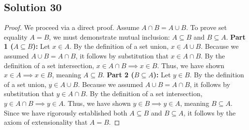 \documentclass[12pt]{article}
\begin{document}
\subsection*{Solution 30}
\begin{proof}
We proceed via a direct proof. Assume $A \cap B = A \cup B$. To prove set equality $A = B$, we must demonstrate mutual inclusion: $A \subseteq B$ and $B \subseteq A$.
\newline\newline
\textbf{Part 1 ($A \subseteq B$):} Let $x \in A$. By the definition of a set union, $x \in A \cup B$. Because we assumed $A \cup B = A \cap B$, it follows by substitution that $x \in A \cap B$. By the definition of a set intersection, $x \in A \cap B \implies x \in B$. Thus, we have shown $x \in A \implies x \in B$, meaning $A \subseteq B$.
\newline\newline
\textbf{Part 2 ($B \subseteq A$):} Let $y \in B$. By the definition of a set union, $y \in A \cup B$. Because we assumed $A \cup B = A \cap B$, it follows by substitution that $y \in A \cap B$. By the definition of a set intersection, $y \in A \cap B \implies y \in A$. Thus, we have shown $y \in B \implies y \in A$, meaning $B \subseteq A$.
\newline\newline
Since we have rigorously established both $A \subseteq B$ and $B \subseteq A$, it follows by the axiom of extensionality that $A = B$.
\end{proof}

\newpage
\end{document}
